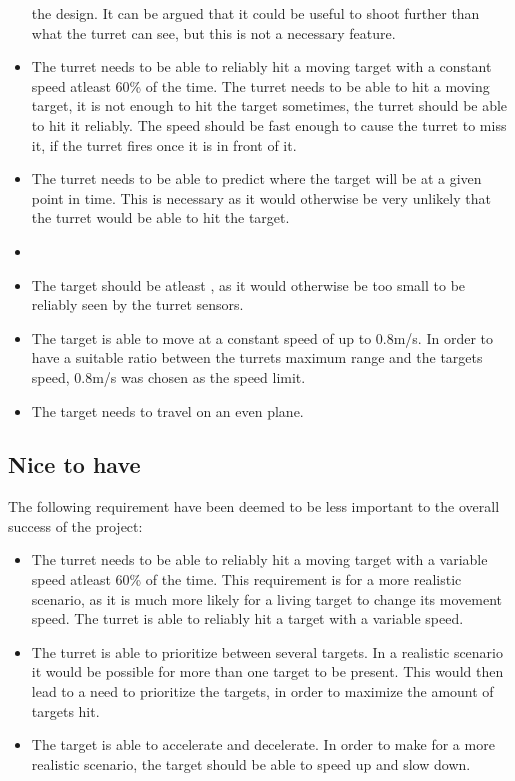 \begin{itemize}
  the design. It can be argued that it could be useful to shoot further than
  what the turret can see, but this is not a necessary feature.
  \item The turret needs to be able to reliably hit a moving target with a
  constant speed atleast 60\% of the time. The turret needs to be able to hit a
  moving target, it is not enough to hit the target sometimes, the turret should
  be able to hit it reliably. The speed should be fast enough to cause the
  turret to miss it, if the turret fires once it is in front of it.
  \item The turret needs to be able to predict where the target will be at a given point
in time. This is necessary as it would otherwise be very unlikely that the
turret would be able to hit the target.
  \item {}
  \item The target should be atleast , as it
would otherwise be too small to be reliably seen by the turret sensors.
  \item The target is able to move at a constant speed of up to 0.8m/s. In order to
have a suitable ratio between the turrets maximum range and the targets
speed, 0.8m/s was chosen as the speed limit.
  \item The target needs to travel on an even plane.
\end{itemize}

\subsection{Nice to have}
The following requirement have been deemed to be less important to the overall
success of the project:
\begin{itemize}
  \item The turret needs to be able to reliably hit a moving target with a
variable speed atleast 60\% of the time. This requirement is for a
more realistic scenario, as it is much more likely for a living target to
change its movement speed. The turret is able to reliably hit a target with a
variable speed.
  \item The turret is able to prioritize between several targets. In a realistic
scenario it would be possible for more than one target to be present. This would
then lead to a need to prioritize the targets, in order to maximize the
amount of targets hit.
  \item The target is able to accelerate and decelerate. In order to make for a
  more realistic scenario, the target should be able to speed up and slow down.
\end{itemize}

